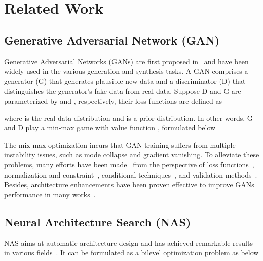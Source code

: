 \documentclass[runningheads]{llncs}
\begin{document}
\section{Related Work}

\subsection{Generative Adversarial Network (GAN)}





Generative Adversarial Networks (GANs) are first proposed in~\cite{goodfellow2014generative} and have been widely used in the various generation and synthesis tasks. A GAN comprises a generator (G) that generates plausible new data and a discriminator (D) that distinguishes the generator's fake data from real data. Suppose D and G are parameterized by  and , respectively, their loss functions are defined as 





\noindent where  is the real data distribution and  is a prior distribution. In other words, G and D play a min-max game with value function , formulated below



\noindent The mix-max optimization incurs that GAN training suffers from multiple instability issues, such as mode collapse and gradient vanishing. To alleviate these problems, many efforts have been made~\cite{bissoto2019six} from the perspective of loss functions~\cite{wgan,improving_mmd_gan,bsgan}, normalization and constraint~\cite{wgan-gp,SNGAN}, conditional techniques~\cite{acgan,stylegan}, and validation methods~\cite{IS,FID}. Besides, architecture enhancements have been proven effective to improve GANs performance in many works~\cite{dcgan,biggan,progressiveGAN}.




\subsection{Neural Architecture Search (NAS)}






NAS aims at automatic architecture design and has achieved remarkable results in various fields~\cite{nas_survey,automl_he}. It can be formulated as a bilevel optimization problem as below
\end{document}
